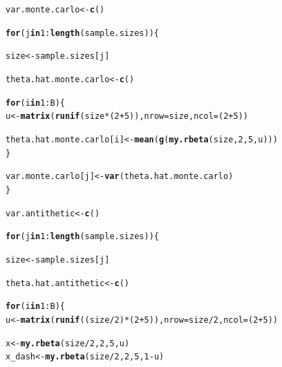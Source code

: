 \documentclass[11pt, a4paper]{article}\usepackage[]{graphicx}\usepackage[]{xcolor}
\makeatletter
\newcommand{\hlnum}[1]{\textcolor[rgb]{0.686,0.059,0.569}{#1}}%
\newcommand{\hlopt}[1]{\textcolor[rgb]{0,0,0}{#1}}%
\newcommand{\hldef}[1]{\textcolor[rgb]{0.345,0.345,0.345}{#1}}%
\newcommand{\hlkwa}[1]{\textcolor[rgb]{0.161,0.373,0.58}{\textbf{#1}}}%
\newcommand{\hlkwb}[1]{\textcolor[rgb]{0.69,0.353,0.396}{#1}}%
\newcommand{\hlkwc}[1]{\textcolor[rgb]{0.333,0.667,0.333}{#1}}%
\newcommand{\hlkwd}[1]{\textcolor[rgb]{0.737,0.353,0.396}{\textbf{#1}}}%
\newenvironment{kframe}{%
 \def\at@end@of@kframe{}%
 \ifinner\ifhmode%
  \def\at@end@of@kframe{\end{minipage}}%
  \begin{minipage}{\columnwidth}%
 \fi\fi%
 \def\FrameCommand##1{\hskip\@totalleftmargin \hskip-\fboxsep
 \colorbox{shadecolor}{##1}\hskip-\fboxsep
     \hskip-\linewidth \hskip-\@totalleftmargin \hskip\columnwidth}%
 \MakeFramed {\advance\hsize-\width
   \@totalleftmargin\z@ \linewidth\hsize
   \@setminipage}}%
 {\par\unskip\endMakeFramed%
 \at@end@of@kframe}
\newenvironment{knitrout}{}{} %
\makeatother
\begin{document}
\begin{enumerate}
\begin{knitrout}
\color{fgcolor}\begin{kframe}
\begin{alltt}
\hldef{var.monte.carlo} \hlkwb{<-} \hlkwd{c}\hldef{()}

\hlkwa{for} \hldef{(j} \hlkwa{in} \hlnum{1}\hlopt{:}\hlkwd{length}\hldef{(sample.sizes)) \{}

  \hldef{size} \hlkwb{<-} \hldef{sample.sizes[j]}

  \hldef{theta.hat.monte.carlo} \hlkwb{<-} \hlkwd{c}\hldef{()}

  \hlkwa{for} \hldef{(i} \hlkwa{in} \hlnum{1}\hlopt{:}\hldef{B) \{}
    \hldef{u} \hlkwb{<-} \hlkwd{matrix}\hldef{(}\hlkwd{runif}\hldef{(size} \hlopt{*} \hldef{(}\hlnum{2} \hlopt{+} \hlnum{5}\hldef{)),} \hlkwc{nrow} \hldef{= size,} \hlkwc{ncol} \hldef{= (}\hlnum{2} \hlopt{+} \hlnum{5}\hldef{))}

    \hldef{theta.hat.monte.carlo[i]} \hlkwb{<-} \hlkwd{mean}\hldef{(}\hlkwd{g}\hldef{(}\hlkwd{my.rbeta}\hldef{(size,} \hlnum{2}\hldef{,} \hlnum{5}\hldef{, u)))}
  \hldef{\}}

  \hldef{var.monte.carlo[j]} \hlkwb{<-} \hlkwd{var}\hldef{(theta.hat.monte.carlo)}
\hldef{\}}
\end{alltt}
\end{kframe}
\end{knitrout}

\begin{knitrout}
\color{fgcolor}\begin{kframe}
\begin{alltt}
\hldef{var.antithetic} \hlkwb{<-} \hlkwd{c}\hldef{()}

\hlkwa{for} \hldef{(j} \hlkwa{in} \hlnum{1}\hlopt{:}\hlkwd{length}\hldef{(sample.sizes)) \{}

  \hldef{size} \hlkwb{<-} \hldef{sample.sizes[j]}

  \hldef{theta.hat.antithetic} \hlkwb{<-} \hlkwd{c}\hldef{()}

  \hlkwa{for} \hldef{(i} \hlkwa{in} \hlnum{1}\hlopt{:}\hldef{B) \{}
    \hldef{u} \hlkwb{<-} \hlkwd{matrix}\hldef{(}\hlkwd{runif}\hldef{((size} \hlopt{/} \hlnum{2}\hldef{)} \hlopt{*} \hldef{(}\hlnum{2} \hlopt{+} \hlnum{5}\hldef{)),} \hlkwc{nrow} \hldef{= size} \hlopt{/} \hlnum{2}\hldef{,} \hlkwc{ncol} \hldef{= (}\hlnum{2} \hlopt{+} \hlnum{5}\hldef{))}

    \hldef{x} \hlkwb{<-} \hlkwd{my.rbeta}\hldef{(size} \hlopt{/} \hlnum{2}\hldef{,} \hlnum{2}\hldef{,} \hlnum{5}\hldef{, u)}
    \hldef{x_dash} \hlkwb{<-} \hlkwd{my.rbeta}\hldef{(size} \hlopt{/} \hlnum{2}\hldef{,} \hlnum{2}\hldef{,} \hlnum{5}\hldef{,} \hlnum{1}\hlopt{-}\hldef{u)}


\end{alltt}
\end{kframe}
\end{knitrout}
\end{enumerate}
\end{document}
